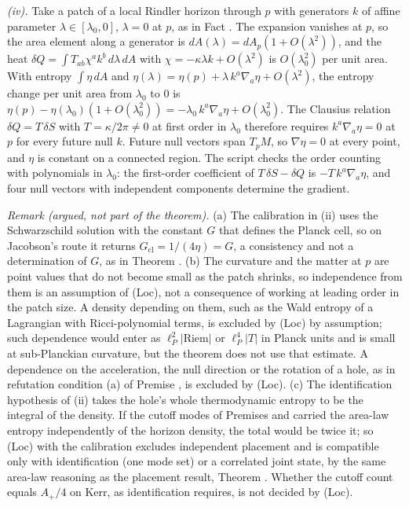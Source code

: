 \emph{(iv).} Take a patch of a local Rindler horizon through $p$ with generators $k$ of affine parameter $\lambda \in [\lambda_{0}, 0]$, $\lambda = 0$ at $p$, as in Fact . The expansion vanishes at $p$, so the area element along a generator is $dA(\lambda) = dA_{p}(1 + O(\lambda^{2}))$, and the heat $\delta Q = \int T_{ab}\chi^{a}k^{b}\,d\lambda\,dA$ with $\chi = -\kappa\lambda k + O(\lambda^{2})$ is $O(\lambda_{0}^{2})$ per unit area. With entropy $\int\eta\,dA$ and $\eta(\lambda) = \eta(p) + \lambda\,k^{a}\nabla_{a}\eta + O(\lambda^{2})$, the entropy change per unit area from $\lambda_{0}$ to $0$ is $\eta(p) - \eta(\lambda_{0})(1 + O(\lambda_{0}^{2})) = -\lambda_{0}\,k^{a}\nabla_{a}\eta + O(\lambda_{0}^{2})$. The Clausius relation $\delta Q = T\,\delta S$ with $T = \kappa/2\pi \neq 0$ at first order in $\lambda_{0}$ therefore requires $k^{a}\nabla_{a}\eta = 0$ at $p$ for every future null $k$. Future null vectors span $T_{p}M$, so $\nabla\eta = 0$ at every point, and $\eta$ is constant on a connected region. The script checks the order counting with polynomials in $\lambda_{0}$: the first-order coefficient of $T\,\delta S - \delta Q$ is $-T\,k^{a}\nabla_{a}\eta$, and four null vectors with independent components determine the gradient.

\emph{Remark (argued, not part of the theorem).} (a) The calibration in (ii) uses the Schwarzschild solution with the constant $G$ that defines the Planck cell, so on Jacobson's route it returns $G_{\mathrm{cl}} = 1/(4\eta) = G$, a consistency and not a determination of $G$, as in Theorem . (b) The curvature and the matter at $p$ are point values that do not become small as the patch shrinks, so independence from them is an assumption of (Loc), not a consequence of working at leading order in the patch size. A density depending on them, such as the Wald entropy of a Lagrangian with Ricci-polynomial terms, is excluded by (Loc) by assumption; such dependence would enter as $\ell_{P}^{2}|\mathrm{Riem}|$ or $\ell_{P}^{4}|T|$ in Planck units and is small at sub-Planckian curvature, but the theorem does not use that estimate. A dependence on the acceleration, the null direction or the rotation of a hole, as in refutation condition (a) of Premise , is excluded by (Loc). (c) The identification hypothesis of (ii) takes the hole's whole thermodynamic entropy to be the integral of the density. If the cutoff modes of Premises  and  carried the area-law entropy independently of the horizon density, the total would be twice it; so (Loc) with the calibration excludes independent placement and is compatible only with identification (one mode set) or a correlated joint state, by the same area-law reasoning as the placement result, Theorem . Whether the cutoff count equals $A_{+}/4$ on Kerr, as identification requires, is not decided by (Loc).
